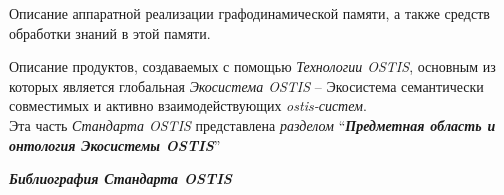\begin{SCn}
{\begin{scnitemize}
\begin{scnitemizeii}
				\item Описание аппаратной реализации графодинамической памяти, а также средств обработки знаний в этой памяти.
			\end{scnitemizeii}
			\item Описание продуктов, создаваемых с помощью \textit{Технологии OSTIS}, основным из которых является глобальная \textit{Экосистема OSTIS} -- Экосистема семантически совместимых и активно взаимодействующих \textit{ostis-систем}.\\
			Эта часть \textit{Стандарта OSTIS} представлена \textit{разделом} ``\textit{\textbf{Предметная область и онтология Экосистемы OSTIS}}''
			\item \textit{\textbf{Библиография Стандарта OSTIS}}
	\end{scnitemize}}
\end{SCn}